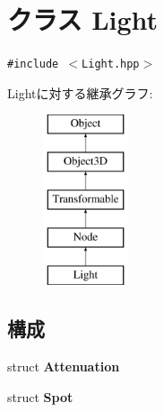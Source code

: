 \hypertarget{classm3g_1_1Light}{
\section{クラス Light}
\label{classm3g_1_1Light}
}
{\tt \#include $<$Light.hpp$>$}

Lightに対する継承グラフ:\begin{figure}[H]
\begin{center}
\leavevmode
\includegraphics[height=5cm]{classm3g_1_1Light}
\end{center}
\end{figure}
\subsection*{構成}
\begin{CompactItemize}
\item 
struct \textbf{Attenuation}
\item 
struct \textbf{Spot}
\end{CompactItemize}

